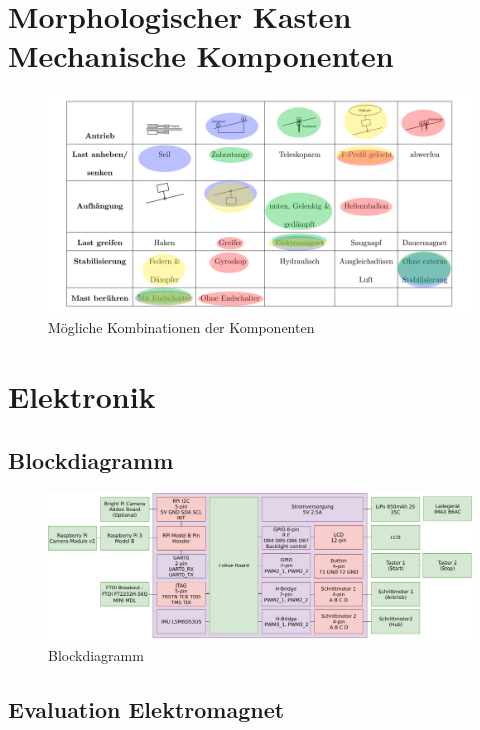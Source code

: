 \documentclass[a4paper]{report}
\begin{document}
\section{Morphologischer Kasten Mechanische Komponenten}
\begin{figure}[h!]
	\includegraphics[keepaspectratio,width=\textwidth]{MorphKasten}
	\caption{Mögliche Kombinationen der Komponenten}
	\label{fig:Morphkasten}
\end{figure}
\clearpage

\section{Elektronik}
\subsection{Blockdiagramm}
\begin{figure}[h!]
  \includegraphics[keepaspectratio,width=\textwidth]{BlockdiagrammElektronik}
  \caption{Blockdiagramm}
  \label{fig:ElektronikBlockdiagramm}
\end{figure}
\newpage
\subsection{Evaluation Elektromagnet}
\end{document}
